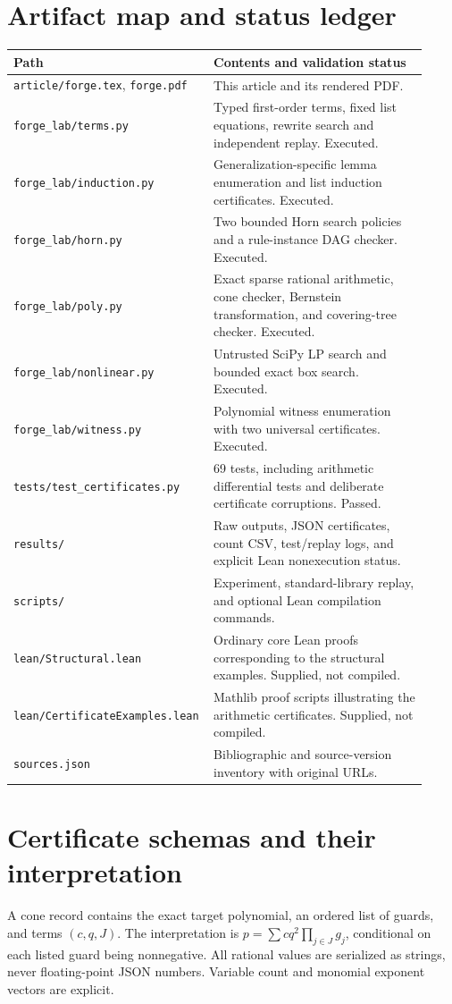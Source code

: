 \documentclass[11pt,a4paper]{article}
\newcommand{\code}[1]{\texttt{#1}}
\begin{document}
\section{Artifact map and status ledger}
\begin{longtable}{p{0.41\linewidth}p{0.51\linewidth}}
\toprule
Path & Contents and validation status \\
\midrule
\endhead
\code{article/forge.tex}, \code{forge.pdf} & This article and its rendered PDF. \\
\code{forge\_lab/terms.py} & Typed first-order terms, fixed list equations, rewrite search and independent replay. Executed. \\
\code{forge\_lab/induction.py} & Generalization-specific lemma enumeration and list induction certificates. Executed. \\
\code{forge\_lab/horn.py} & Two bounded Horn search policies and a rule-instance DAG checker. Executed. \\
\code{forge\_lab/poly.py} & Exact sparse rational arithmetic, cone checker, Bernstein transformation, and covering-tree checker. Executed. \\
\code{forge\_lab/nonlinear.py} & Untrusted SciPy LP search and bounded exact box search. Executed. \\
\code{forge\_lab/witness.py} & Polynomial witness enumeration with two universal certificates. Executed. \\
\code{tests/test\_certificates.py} & 69 tests, including arithmetic differential tests and deliberate certificate corruptions. Passed. \\
\code{results/} & Raw outputs, JSON certificates, count CSV, test/replay logs, and explicit Lean nonexecution status. \\
\code{scripts/} & Experiment, standard-library replay, and optional Lean compilation commands. \\
\code{lean/Structural.lean} & Ordinary core Lean proofs corresponding to the structural examples. Supplied, not compiled. \\
\code{lean/CertificateExamples.lean} & Mathlib proof scripts illustrating the arithmetic certificates. Supplied, not compiled. \\
\code{sources.json} & Bibliographic and source-version inventory with original URLs. \\
\bottomrule
\end{longtable}

\section{Certificate schemas and their interpretation}
A cone record contains the exact target polynomial, an ordered list of guards,
and terms $(c,q,J)$. The interpretation is
$p=\sum c q^2\prod_{j\in J}g_j$, conditional on each listed guard being
nonnegative. All rational values are serialized as strings, never floating-point
JSON numbers. Variable count and monomial exponent vectors are explicit.
\end{document}

